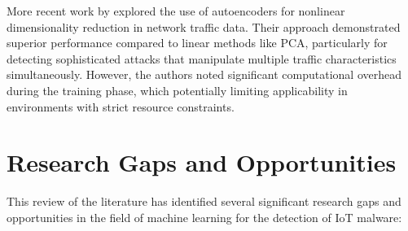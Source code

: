 More recent work by \cite{Passerini2019} explored the use of autoencoders for nonlinear dimensionality reduction in network traffic data. Their approach demonstrated superior performance compared to linear methods like PCA, particularly for detecting sophisticated attacks that manipulate multiple traffic characteristics simultaneously. However, the authors noted significant computational overhead during the training phase, which potentially limiting applicability in environments with strict resource constraints.



\section{Research Gaps and Opportunities}

This review of the literature has identified several significant research gaps and opportunities in the field of machine learning for the detection of IoT malware:

